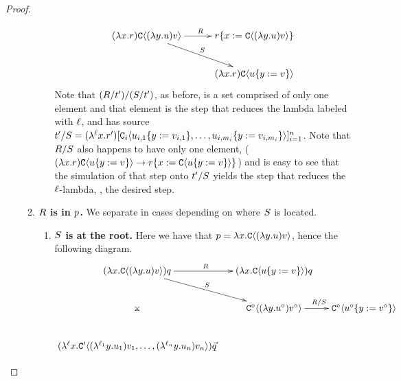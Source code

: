 \begin{proof}
\begin{enumerate}
\begin{enumerate}
\begin{enumerate}
\[            \xymatrix@C=1cm{
              (\lam{\var}{\tmfour}) \conof{(\lam{\vartwo}{\tmthree}) \tmthreevariant}
                \ar@{->}[r]^{\redex} \ar@{->}[rd]^{\redextwo}
                  & \subs{\tmfour}{\var}{\conof{(\lam{\vartwo}{\tmthree}) \tmthreevariant}} \\
                & (\lam{\var}{\tmfour}) \conof{\subs{\tmthree}{\vartwo}{\tmthreevariant}} \\
            }
            \]
            Note that $(R / t') / (S / t')$, as before, is a set comprised of only one element
            and that element is the step that reduces the lambda labeled with $\ell$, and has source
            $t' / S = (\lambda^{\ell} x. r')[
              \mathtt{C}_i\langle u_{i,1}\{y := v_{i,1}\}, \hdots, u_{i,m_i}\{y := v_{i,m_i}\}\rangle]_{i=1}^n$.
            Note that $R / S$ also happens to have only one element,
            ($(\lambda x. r) \mathtt{C}\langle u\{y := v\}\rangle \to
              r\{x := \mathtt{C}\langle u\{y := v\}\rangle\}$)
            and is easy to see that the simulation of that step onto
            $t' / S$
            yields the step that reduces the $\ell$-lambda, \ie, the desired step.
        \end{enumerate}
      \item {\bf $R$ is in $p$.} We separate in cases depending on where $S$ is located.
        \begin{enumerate}
          \item {\bf $S$ is at the root.}
            Here we have that $p = \lambda x. \mathtt{C}\langle(\lambda y. u) v\rangle$, hence
            the following diagram.
            {\tiny
            \[
              \xymatrix@C=.5cm{
              (\lam{\var}{\conof{(\lam{\vartwo}{\tmthree}) \tmthreevariant}}) \tmsix
                \ar@{->}[r]^{\redex} \ar@{->}[rd]^{\redextwo} \ar@{}[dd]|*=0[@]{\rtimes}
                  & (\lam{\var}{\conof{\subs{\tmthree}{\vartwo}{\tmthreevariant}}}) \tmsix & \\
                & \con^{\circ}\of{(\lam{\vartwo}{\tmthree^{\circ}}) \tmthreevariant^{\circ}}
                  \ar@{->}[r]^{\redex / \redextwo}
                  & \con^{\circ}\of{\subs{\tmthree^{\circ}}{\vartwo}{\tmthreevariant^{\circ}}} \\
              (\lamp{\lab}{\var}{\con'\of{(\lamp{\lab_1}{\vartwo}{\tmthree_1}) \tmthreevariant_1, \hdots, (\lamp{\lab_n}{\vartwo}{\tmthree_n}) \tmthreevariant_n}}) \ls{\tmsix}
}\]}
\end{enumerate}
\end{enumerate}
\end{enumerate}
\end{proof}
